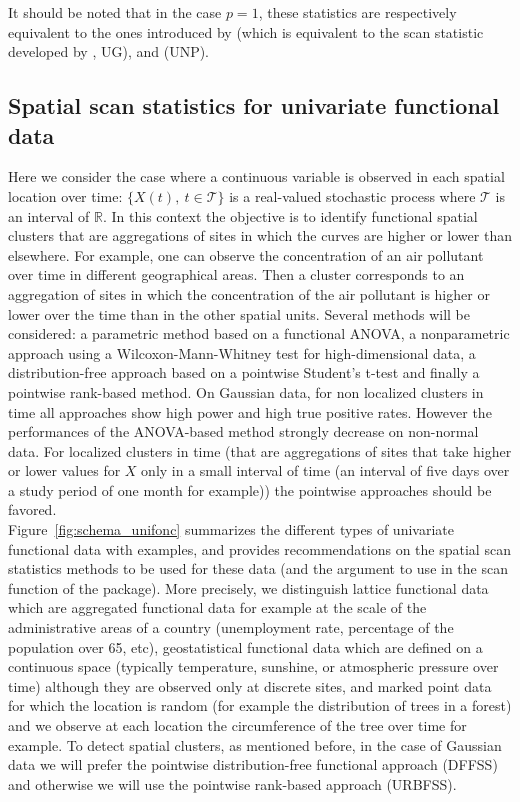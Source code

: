 \noindent It should be noted that in the case $p=1$, these statistics are respectively equivalent  to the ones introduced by \citet{normalkulldorff} (which is equivalent to the scan statistic developed by \citet{a_distribution_free}, UG), and \citet{A_nonparametric_spatial} (UNP).

\subsection{Spatial scan statistics for univariate functional data}

Here we consider the case where a continuous variable is observed in each spatial location over time: $\{ X(t), \ t \in \mathcal{T} \}$ is a real-valued stochastic process where $\mathcal{T}$ is an interval of $\mathbb{R}$. In this context the objective is to identify functional spatial clusters that are aggregations of sites in which the curves are higher or lower than elsewhere. For example, one can observe the concentration of an air pollutant over time in different geographical areas. Then a cluster corresponds to an aggregation of sites in which the concentration of the air pollutant is higher or lower over the time than in the other spatial units. Several methods will be considered: a parametric method based on a functional ANOVA, a nonparametric approach using a Wilcoxon-Mann-Whitney test for high-dimensional data, a distribution-free approach based on a pointwise Student's t-test and finally a pointwise rank-based method. On Gaussian data, for non localized clusters in time all approaches show high power and high true positive rates. However the performances of the ANOVA-based method strongly decrease on non-normal data. For localized clusters in time (that are aggregations of sites that take higher or lower values for $X$ only in a small interval of time (an interval of five days over a study period of one month for example)) the pointwise approaches should be favored. \\
Figure~\ref{fig:schema_unifonc} summarizes the different types of univariate functional data with examples, and provides recommendations on the spatial scan statistics methods to be used for these data (and the argument to use in the scan function of the package). More precisely, we distinguish lattice functional data which are aggregated functional data for example at the scale of the administrative areas of a country (unemployment rate, percentage of the population over 65, etc), geostatistical functional data which are defined on a continuous space (typically temperature, sunshine, or atmospheric pressure over time) although they are observed only at discrete sites, and marked point data for which the location is random (for example the distribution of trees in a forest) and we observe at each location the circumference of the tree over time for example. To detect spatial clusters, as mentioned before, in the case of Gaussian data we will prefer the pointwise distribution-free functional approach (DFFSS) and otherwise we will use the pointwise rank-based approach (URBFSS). \\


